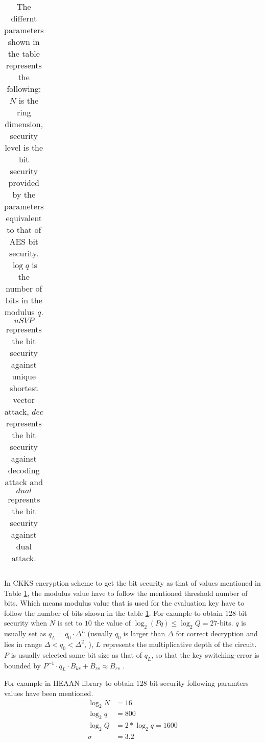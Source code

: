 \documentclass[a4paper,10pt]{article}
\begin{document}
\begin{center}
\begin{table}[h]
\begin{tabular}{|c|c|c|c|c|c|}
\end{tabular}
\caption{The differnt parameters shown in the table represents the following: $N$ is the ring dimension, security level is the bit security provided by the parameters equivalent to that of AES bit security. $\log q$ is the number of bits in the modulus $q$. $uSVP$ represents the bit security against unique shortest vector attack, $dec$ represents the bit security against decoding attack and $dual$ represnts the bit security against dual attack.}
\label{Tab:bit_security}
\end{table}
\end{center}

In CKKS encryption scheme to get the bit security as that of values mentioned in Table \ref{Tab:bit_security}, the modulus value have to follow the mentioned threshold number of bits. Which means modulus value that is used for the evaluation key have to follow the number of bits shown in the table \ref{Tab:bit_security}\cite{kim2022approximate}. For example to obtain $128$-bit security when $N$ is set to $10$ the value of $\log_2{(Pq)} \leq \log_2{Q} =27$-bits. $q$ is usually set as $q_L=q_0\cdot \Delta^L$ (usually $q_0$ is larger than $\Delta$ for correct decryption \cite{kim2022approximate} and lies in range $\Delta<q_0<\Delta^2$, \cite{cheon2021practical}), $L$ represents the multiplicative depth of the circuit. $P$ is usually selected same bit size as that of $q_L$, so that the key switching-error is bounded by $P^{-1}\cdot q_L \cdot B_{ks}+B_{rs} \approx B_{rs}$ \cite{cheon2017homomorphic}.

For example in HEAAN library to obtain $128$-bit security following paramters values have been mentioned.
\begin{align*}
\log_2{N}     &= 16           \\
\log_2{q}     &= 800          \\
\log_2{Q}     &= 2*\log_2{q} = 1600 \\
\sigma        &= 3.2          \\
\end{align*}
\end{document}
